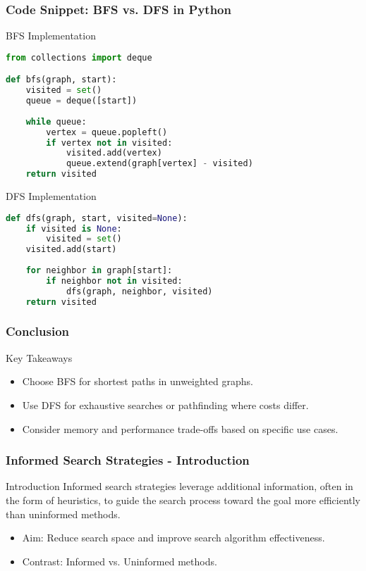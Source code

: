 \documentclass[aspectratio=169]{beamer}
\begin{document}
\begin{frame}[fragile]
    \frametitle{Code Snippet: BFS vs. DFS in Python}
    \begin{block}{BFS Implementation}
    \begin{lstlisting}[language=Python]
from collections import deque

def bfs(graph, start):
    visited = set()
    queue = deque([start])
    
    while queue:
        vertex = queue.popleft()
        if vertex not in visited:
            visited.add(vertex)
            queue.extend(graph[vertex] - visited)
    return visited
    \end{lstlisting}
    \end{block}
    \begin{block}{DFS Implementation}
    \begin{lstlisting}[language=Python]
def dfs(graph, start, visited=None):
    if visited is None:
        visited = set()
    visited.add(start)
    
    for neighbor in graph[start]:
        if neighbor not in visited:
            dfs(graph, neighbor, visited)
    return visited
    \end{lstlisting}
    \end{block}
\end{frame}

\begin{frame}
    \frametitle{Conclusion}
    \begin{block}{Key Takeaways}
        \begin{itemize}
            \item Choose BFS for shortest paths in unweighted graphs.
            \item Use DFS for exhaustive searches or pathfinding where costs differ.
            \item Consider memory and performance trade-offs based on specific use cases.
        \end{itemize}
    \end{block}
\end{frame}

\begin{frame}[fragile]
    \frametitle{Informed Search Strategies - Introduction}
    \begin{block}{Introduction}
        Informed search strategies leverage additional information, often in the form of heuristics, to guide the search process toward the goal more efficiently than uninformed methods. 
    \end{block}
    
    \begin{itemize}
        \item Aim: Reduce search space and improve search algorithm effectiveness.
        \item Contrast: Informed vs. Uninformed methods.
    \end{itemize}
\end{frame}
\end{document}
